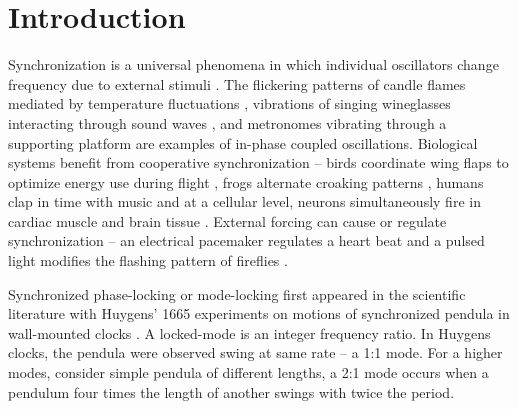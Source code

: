 \documentclass[twocolumn,preprintnumbers,amsmath,amssymb,aps,prx]{revtex4}
\begin{document}
\maketitle %

\section{Introduction} %
%
Synchronization is a universal phenomena
in which
individual oscillators change frequency due
to external stimuli \cite{Pikovsky2003}.
The
flickering patterns of
candle flames mediated by temperature fluctuations \cite{Okamoto2016},
vibrations of singing wineglasses interacting 
through sound waves \cite{Arane2009}, 
and metronomes vibrating through a supporting platform \cite{Jia2015}
are examples of in-phase coupled oscillations. %
Biological systems benefit from cooperative
synchronization -- %
birds coordinate wing flaps
to optimize energy use during flight \cite{Portugal2014},
frogs alternate croaking patterns \cite{Aihara2014},
humans clap in time with music \cite{Tranchant2016}
and 
at a cellular level, 
neurons simultaneously fire in cardiac muscle \cite{MartinHall1999}
and brain tissue \cite{Singer1999}.
External forcing can cause or regulate 
synchronization %
-- %
an electrical pacemaker %
regulates a heart beat 
and 
a pulsed light modifies the
flashing pattern of fireflies .%

Synchronized phase-locking or mode-locking 
first appeared in the scientific literature
with 
Huygens' 1665 experiments on
motions of synchronized 
pendula in wall-mounted clocks \cite{Bennett2002}.
A locked-mode is an integer frequency ratio.
In Huygens clocks,
the pendula were observed swing at same rate -- a 1:1 mode.
For a higher modes,
consider simple pendula of different lengths,
a 2:1 mode occurs when a pendulum four
times the length of another swings with twice the period.
%
\end{document}
